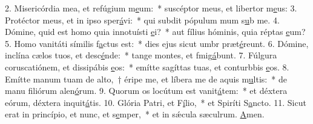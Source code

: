 2. Misericórdia mea, et refúgium m\uline{e}um:~* suscéptor meus, et libertor m\uline{e}us:
3. Protéctor meus, et in ipso sper\uline{á}vi:~* qui subdit pópulum mum s\uline{u}b me.
4. Dómine, quid est homo quia innotuísti \uline{e}i?~* aut fílius hóminis, quia réptas \uline{e}um?
5. Homo vanitáti símilis f\uline{a}ctus est:~* dies ejus sicut umbr præt\uline{é}reunt.
6. Dómine, inclína cælos tuos, et desc\uline{é}nde:~* tange montes, et fmig\uline{á}bunt.
7. Fúlgura coruscatiónem, et dissipábis \uline{e}os:~* emítte sagíttas tuas, et conturbbis \uline{e}os.
8. Emítte manum tuam de alto,~† éripe me, et líbera me de aquis m\uline{u}ltis:~* de manu filiórum alen\uline{ó}rum.
9. Quorum os locútum est vanit\uline{á}tem:~* et déxtera eórum, déxtera inquit\uline{á}tis.
10. Glória Patri, et F\uline{í}lio,~* et Spiríti S\uline{a}ncto.
11. Sicut erat in princípio, et nunc, et s\uline{e}mper,~* et in sǽcula sæculrum. \uline{A}men.
